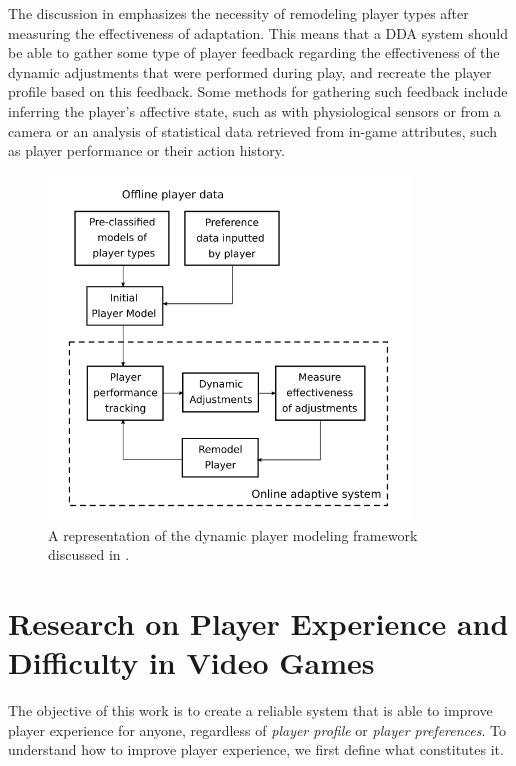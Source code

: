 \documentclass[cic,tc,english]{iiufrgs}
\begin{document}
The discussion in \cite{ARTICLE_DynamicPlayerModelling} emphasizes the necessity of remodeling player types after measuring the effectiveness of adaptation. This means that a DDA system should be able to gather some type of player feedback regarding the effectiveness of the dynamic adjustments that were performed during play, and recreate the player profile based on this feedback. Some methods for gathering such feedback include inferring the player's affective state, such as with physiological sensors or from a camera or an analysis of statistical data retrieved from in-game attributes, such as player performance or their action history.

\begin{figure}[!h]
    \caption{A representation of the dynamic player modeling framework discussed in \cite{ARTICLE_DynamicPlayerModelling}.}
    \begin{center}
        \includegraphics[width=26em]{figures/fig-dynamic-player-model.png}
    \end{center}
    \label{fig:dynamic-player-model}
\end{figure}

\section{Research on Player Experience and Difficulty in Video Games}

The objective of this work is to create a reliable system that is able to improve player experience for anyone, regardless of \emph{player profile} or \emph{player preferences}. To understand how to improve player experience, we first define what constitutes it.
\end{document}
